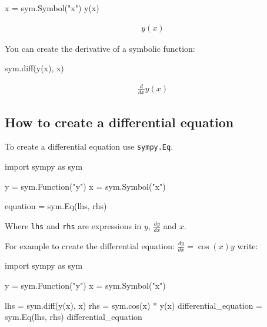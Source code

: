 \begin{pyin}
x = sym.Symbol("x")
y(x)
\end{pyin}




\begin{equation*}
\begin{split}\displaystyle y{\left(x \right)}\end{split}
\end{equation*}




You can create the derivative of a symbolic function:




\begin{pyin}
sym.diff(y(x), x)
\end{pyin}




\begin{equation*}
\begin{split}\displaystyle \frac{d}{d x} y{\left(x \right)}\end{split}
\end{equation*}




\subsection{How to create a differential equation}
\label{\detokenize{tools-for-mathematics/09-differential-equations/how/main:how-to-create-a-differential-equation}}

To create a differential equation use \texttt{sympy.Eq}.


\begin{api}
import sympy as sym

y = sym.Function("y")
x = sym.Symbol("x")

equation = sym.Eq(lhs, rhs)
\end{api}



Where \texttt{lhs} and \texttt{rhs} are expressions in \(y\), \(\frac{dy}{dx}\) and \(x\).


For example to create the differential equation: \(\frac{dy}{dx} = \cos(x) y\)
write:




\begin{pyin}
import sympy as sym

y = sym.Function("y")
x = sym.Symbol("x")

lhs = sym.diff(y(x), x)
rhs = sym.cos(x) * y(x)
differential_equation = sym.Eq(lhs, rhs)
differential_equation
\end{pyin}




